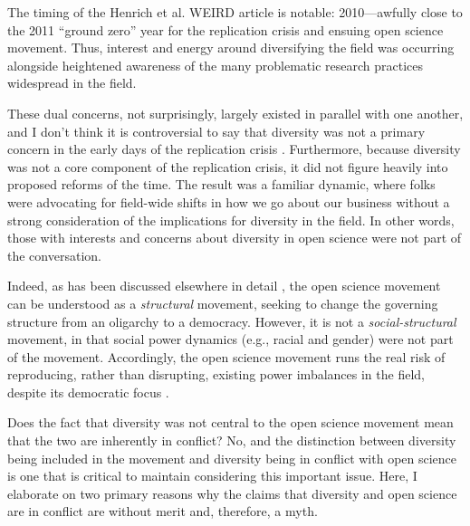 \documentclass[authordate, empirical]{jote-new-article}
\begin{document}
The timing of the Henrich et al. WEIRD article is notable: 2010—awfully close to the 2011 “ground zero” year for the replication crisis and ensuing open science movement. Thus, interest and energy around diversifying the field was occurring alongside heightened awareness of the many problematic research practices widespread in the field.







These dual concerns, not surprisingly, largely existed in parallel with one another, and I don't think it is controversial to say that diversity was not a primary concern in the early days of the replication crisis \parencites[e.g.,][]{Beer2023}{Lewis2017}. Furthermore, because diversity was not a core component of the replication crisis, it did not figure heavily into proposed reforms of the time. The result was a familiar dynamic, where folks were advocating for field-wide shifts in how we go about our business without a strong consideration of the implications for diversity in the field. In other words, those with interests and concerns about diversity in open science were not part of the conversation.







Indeed, as has been discussed elsewhere in detail \parencites{Syed2022}, the open science movement can be understood as a \emph{structural} movement, seeking to change the governing structure from an oligarchy to a democracy. However, it is not a \emph{social-structural} movement, in that social power dynamics (e.g., racial and gender) were not part of the movement. Accordingly, the open science movement runs the real risk of reproducing, rather than disrupting, existing power imbalances in the field, despite its democratic focus \parencites{Grzanka2021}.







Does the fact that diversity was not central to the open science movement mean that the two are inherently in conflict? No, and the distinction between diversity being included in the movement and diversity being in conflict with open science is one that is critical to maintain considering this important issue. Here, I elaborate on two primary reasons why the claims that diversity and open science are in conflict are without merit and, therefore, a myth.
\end{document}
